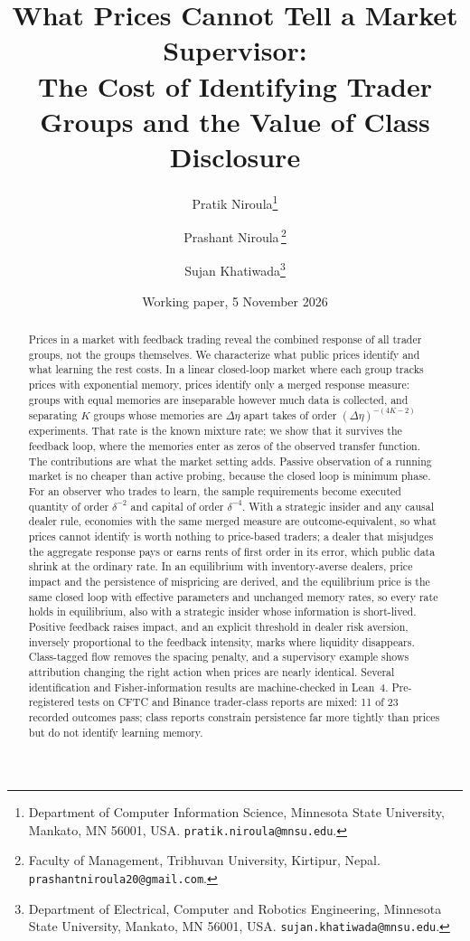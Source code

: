 \documentclass[12pt]{article}
\title{What Prices Cannot Tell a Market Supervisor:\\ The Cost of Identifying Trader Groups and the Value of Class Disclosure}
\author{Pratik Niroula\thanks{Department of Computer Information Science, Minnesota State University, Mankato, MN 56001, USA. \texttt{pratik.niroula@mnsu.edu}.}
\and Prashant Niroula\,\thanks{Faculty of Management, Tribhuvan University, Kirtipur, Nepal. \texttt{prashantniroula20@gmail.com}.}
\and Sujan Khatiwada\thanks{Department of Electrical, Computer and Robotics Engineering, Minnesota State University, Mankato, MN 56001, USA. \texttt{sujan.khatiwada@mnsu.edu}.}}
\date{Working paper, 5 November 2026}
\theoremstyle{definition}
\theoremstyle{remark}
\begin{document}
\maketitle
\thispagestyle{empty}
\begingroup\onehalfspacing

\begin{abstract}
\noindent Prices in a market with feedback trading reveal the combined response of all trader groups, not the groups themselves. We characterize what public prices identify and what learning the rest costs. In a linear closed-loop market where each group tracks prices with exponential memory, prices identify only a merged response measure: groups with equal memories are inseparable however much data is collected, and separating $K$ groups whose memories are $\Delta\eta$ apart takes of order $(\Delta\eta)^{-(4K-2)}$ experiments. That rate is the known mixture rate; we show that it survives the feedback loop, where the memories enter as zeros of the observed transfer function. The contributions are what the market setting adds. Passive observation of a running market is no cheaper than active probing, because the closed loop is minimum phase. For an observer who trades to learn, the sample requirements become executed quantity of order $\delta^{-2}$ and capital of order $\delta^{-4}$. With a strategic insider and any causal dealer rule, economies with the same merged measure are outcome-equivalent, so what prices cannot identify is worth nothing to price-based traders; a dealer that misjudges the aggregate response pays or earns rents of first order in its error, which public data shrink at the ordinary rate. In an equilibrium with inventory-averse dealers, price impact and the persistence of mispricing are derived, and the equilibrium price is the same closed loop with effective parameters and unchanged memory rates, so every rate holds in equilibrium, also with a strategic insider whose information is short-lived. Positive feedback raises impact, and an explicit threshold in dealer risk aversion, inversely proportional to the feedback intensity, marks where liquidity disappears. Class-tagged flow removes the spacing penalty, and a supervisory example shows attribution changing the right action when prices are nearly identical. Several identification and Fisher-information results are machine-checked in Lean~4. Pre-registered tests on CFTC and Binance trader-class reports are mixed: 11 of 23 recorded outcomes pass; class reports constrain persistence far more tightly than prices but do not identify learning memory.
\end{abstract}
\end{document}
